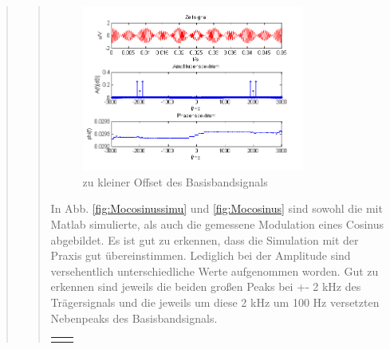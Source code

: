 \begin{quote}
\begin{quote}
	 \begin{figure}[H]
		\begin{center}
			\includegraphics[width=0.8\textwidth]{Bilder/Cos_zukleinerOffset}
		\end{center}
		\caption{zu kleiner Offset des Basisbandsignals}
		\label{fig:Offs}
	\end{figure}
        
        In Abb. \ref{fig:Mocosinussimu} und \ref{fig:Mocosinus} sind sowohl die
        mit Matlab simulierte, als auch die gemessene Modulation eines Cosinus
        abgebildet. Es ist gut zu erkennen, dass die Simulation mit der Praxis
        gut übereinstimmen. Lediglich bei der Amplitude sind versehentlich
        unterschiedliche Werte aufgenommen worden.
        Gut zu erkennen sind jeweils die beiden großen Peaks bei +- 2 kHz des
        Trägersignals und die jeweils um diese 2 kHz um 100 Hz versetzten
        Nebenpeaks des Basisbandsignals.
        
        \begin{center}
        \begin{tabular}{ll}
        
        \hspace{-5cm}
            \begin{minipage}{0.67\textwidth}
                

\end{minipage}
\end{tabular}
\end{center}
\end{quote}
\end{quote}
